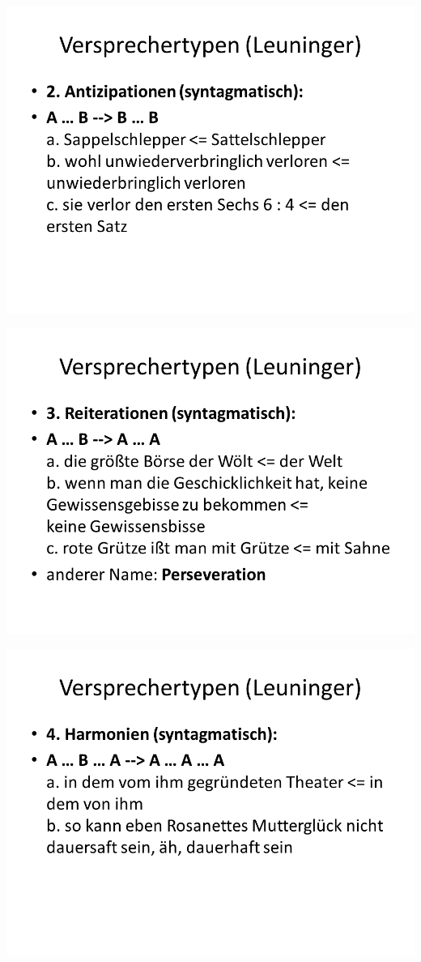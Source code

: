 \documentclass[
  letterpaper,
]{scrbook}
\begin{document}
\includegraphics[width=1\textwidth,height=\textheight]{./pictures/Versprechertypen_4.PNG}

\includegraphics[width=1\textwidth,height=\textheight]{./pictures/Versprechertypen_5.PNG}

\includegraphics[width=1\textwidth,height=\textheight]{./pictures/Versprechertypen_6.PNG}
\end{document}
